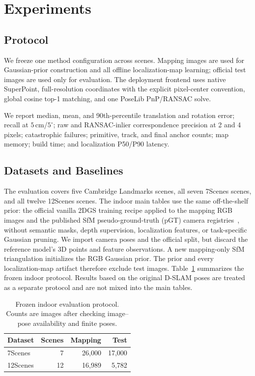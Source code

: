 \section{Experiments}

\subsection{Protocol}

We freeze one method configuration across scenes. Mapping images are used for
Gaussian-prior construction and all offline localization-map learning; official
test images are used only for evaluation. The deployment frontend uses native
SuperPoint, full-resolution coordinates with the explicit pixel-center
convention, global cosine top-1 matching, and one PoseLib PnP/RANSAC solve.

We report median, mean, and 90th-percentile translation and rotation error;
recall at $5\,$cm/$5^\circ$; raw and RANSAC-inlier correspondence precision at
2 and 4 pixels; catastrophic failures; primitive, track, and final anchor
counts; map memory; build time; and localization P50/P90 latency.

\subsection{Datasets and Baselines}

The evaluation covers five Cambridge Landmarks scenes, all seven 7Scenes
scenes, and all twelve 12Scenes scenes. The indoor main tables use the same
off-the-shelf prior: the official vanilla 2DGS training recipe applied to the
mapping RGB images and the published SfM pseudo-ground-truth (pGT) camera
registries~\cite{brachmann2021pgt}, without semantic masks, depth supervision,
localization features, or task-specific Gaussian pruning. We import camera
poses and the official split, but discard the reference model's 3D points and
feature observations. A new mapping-only SfM triangulation initializes the RGB
Gaussian prior. The prior and every localization-map artifact therefore
exclude test images. Table~\ref{tab:indoor_protocol} summarizes the frozen
indoor protocol. Results based on the original D-SLAM poses are treated as a
separate protocol and are not mixed into the main tables.

\begin{table}[t]
  \centering
  \caption{Frozen indoor evaluation protocol. Counts are images after checking
  image--pose availability and finite poses.}
  \label{tab:indoor_protocol}
  \small
  \begin{tabular}{lrrr}
    \toprule
    Dataset & Scenes & Mapping & Test \\
    \midrule
    7Scenes  & 7  & 26,000 & 17,000 \\
    12Scenes & 12 & 16,989 & 5,782 \\
    \bottomrule
  \end{tabular}
\end{table}

